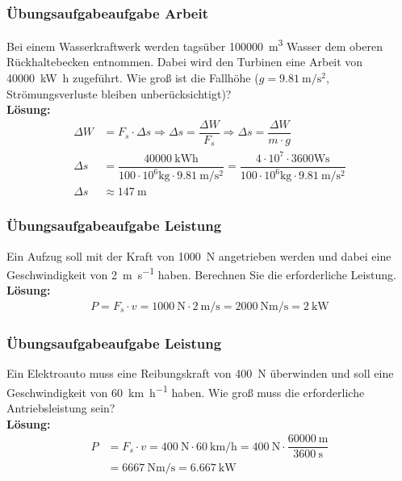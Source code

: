 \documentclass{beamer}
\begin{document}
\frame
{
  \frametitle{Übungsaufgabeaufgabe Arbeit}
{
Bei einem Wasserkraftwerk werden tagsüber \SI{100000}{\cubic\meter} Wasser dem oberen Rückhaltebecken entnommen. Dabei wird den Turbinen eine Arbeit von \SI{40000}{\kilo\watt\hour} zugeführt. Wie groß ist die Fallhöhe ($g=\SI{9,81}{\meter\per\square\second}$, Strömungsverluste bleiben unberücksichtigt)?\\
}
{
\textbf{Lösung:}	
	\begin{align*}
	\Delta W&=F_s\cdot \Delta s\Rightarrow\Delta s=\dfrac{\Delta W}{F_s}\Rightarrow\Delta s=\dfrac{\Delta W}{m\cdot g}\\
	\Delta s&=\dfrac{\SI{40000}{\kilo\watt\hour}}{100\cdot 10^6\si{\kilo\gram}\cdot \SI{9,81}{\meter\per\square\second}}=\dfrac{4\cdot 10^7\cdot 3600\si{\watt\second}}{100\cdot 10^6\si{\kilo\gram}\cdot \SI{9,81}{\meter\per\square\second}}\\
	\Delta s&\approx\SI{147}{\meter}
	\end{align*}
}
}

\frame
{
  \frametitle{Übungsaufgabeaufgabe Leistung}
{
Ein Aufzug soll mit der Kraft von \SI{1000}{\newton} angetrieben werden und dabei eine Geschwindigkeit von \SI{2}{\meter\per\second} haben. Berechnen Sie die erforderliche Leistung.\\
}
{
\textbf{Lösung:}	
	\begin{align*}
	P=F_s\cdot v=\SI{1000}{\newton}\cdot\SI{2}{\meter\per\second}=\SI{2000}{\newton\meter\per\second}=\SI{2}{\kilo\watt}
	\end{align*}
}
}

\frame
{
  \frametitle{Übungsaufgabeaufgabe Leistung}
{
Ein Elektroauto muss eine Reibungskraft von \SI{400}{\newton} überwinden und soll eine Geschwindigkeit von \SI{60}{\kilo\meter\per\hour} haben. Wie groß muss die erforderliche Antriebsleistung sein?\\
}
{
\textbf{Lösung:}	
	\begin{align*}
	P&=F_s\cdot v=\SI{400}{\newton}\cdot\SI{60}{\kilo\meter\per\hour}=\SI{400}{\newton}\cdot\dfrac{\SI{60000}{\meter}}{\SI{3600}{\second}}\\&=\SI{6667}{\newton\meter\per\second}=\SI{6,667}{\kilo\watt}
	\end{align*}
}
}
\end{document}
